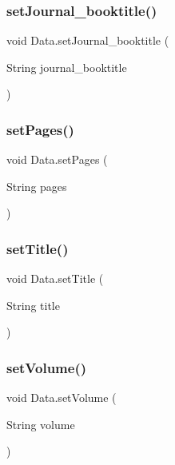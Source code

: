 \subsubsection{\texorpdfstring{set\+Journal\+\_\+booktitle()}{setJournal\_booktitle()}}
{\footnotesize\ttfamily void Data.\+set\+Journal\+\_\+booktitle (\begin{DoxyParamCaption}\item[{String}]{journal\+\_\+booktitle }\end{DoxyParamCaption})}

\hypertarget{class_data_a368b24c15d79a0ec0c33f031f489d616}{}\label{class_data_a368b24c15d79a0ec0c33f031f489d616} 
\subsubsection{\texorpdfstring{set\+Pages()}{setPages()}}
{\footnotesize\ttfamily void Data.\+set\+Pages (\begin{DoxyParamCaption}\item[{String}]{pages }\end{DoxyParamCaption})}

\hypertarget{class_data_a4efe69d1a38809de935950b0c344ac94}{}\label{class_data_a4efe69d1a38809de935950b0c344ac94} 
\subsubsection{\texorpdfstring{set\+Title()}{setTitle()}}
{\footnotesize\ttfamily void Data.\+set\+Title (\begin{DoxyParamCaption}\item[{String}]{title }\end{DoxyParamCaption})}

\hypertarget{class_data_a7112127b737cbae7671940486a3a2f2f}{}\label{class_data_a7112127b737cbae7671940486a3a2f2f} 
\subsubsection{\texorpdfstring{set\+Volume()}{setVolume()}}
{\footnotesize\ttfamily void Data.\+set\+Volume (\begin{DoxyParamCaption}\item[{String}]{volume }\end{DoxyParamCaption})}

